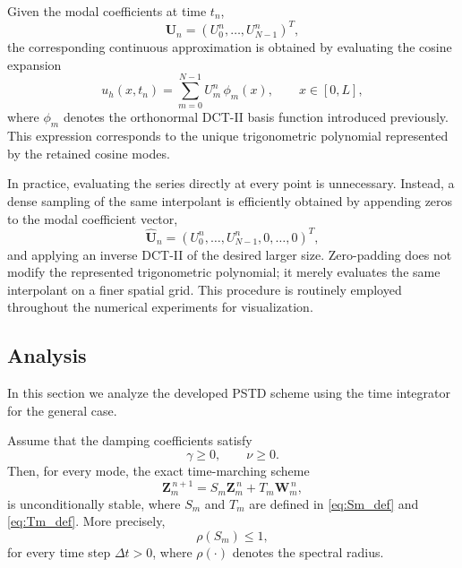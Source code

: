 \documentclass{Configuration_Files/PoliMi3i_thesis}
\begin{document}
Given the modal coefficients at time $t_n$,
\[
\mathbf U_n=
(U_0^n,\ldots,U_{N-1}^n)^T,
\]
the corresponding continuous approximation is obtained by evaluating the cosine
expansion
\begin{equation*}
u_h(x,t_n)
=
\sum_{m=0}^{N-1}
U_m^n\,\phi_m(x),
\qquad
x\in[0,L],
\end{equation*}
where $\phi_m$ denotes the orthonormal DCT-II basis function introduced
previously. This expression corresponds to the unique trigonometric polynomial
represented by the retained cosine modes.

In practice, evaluating the series directly at every point is unnecessary.
Instead, a dense sampling of the same interpolant is efficiently obtained by
appending zeros to the modal coefficient vector,
\[
\widehat{\mathbf U}_n
=
(U_0^n,\ldots,U_{N-1}^n,
0,\ldots,0)^T,
\]
and applying an inverse DCT-II of the desired larger size. Zero-padding does
not modify the represented trigonometric polynomial; it merely evaluates the
same interpolant on a finer spatial grid. This procedure is routinely employed
throughout the numerical experiments for visualization.

\subsection{Analysis}
In this section we analyze the developed PSTD scheme using the time integrator for the general case.

\begin{proposition}
\label{prop:stability}
Assume that the damping coefficients satisfy
\begin{equation*}
\gamma\ge0,
\qquad
\nu\ge0.
\end{equation*}
Then, for every mode, the exact time-marching scheme
\begin{equation*}
\mathbf Z_m^{\,n+1}
=
S_m
\mathbf Z_m^{\,n}
+
T_m
\mathbf W_m^{\,n},
\end{equation*}
is unconditionally stable, where $S_m$ and $T_m$ are defined in \eqref{eq:Sm_def} and \eqref{eq:Tm_def}. More precisely,
\begin{equation*}
\rho(S_m)\le1,
\end{equation*}
for every time step $\Delta t>0$, where $\rho(\cdot)$ denotes the spectral
radius.
\end{proposition}
\end{document}
